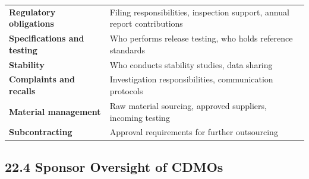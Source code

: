 \documentclass[
  11pt,
  a4paper,
]{report}
\begin{document}
\begin{longtable}[]{@{}ll@{}}
\begin{minipage}[t]{0.38\columnwidth}
\textbf{Regulatory obligations}\strut
\end{minipage} & \begin{minipage}[t]{0.56\columnwidth}\raggedright
Filing responsibilities, inspection support, annual report
contributions\strut
\end{minipage}\tabularnewline
\begin{minipage}[t]{0.38\columnwidth}\raggedright
\textbf{Specifications and testing}\strut
\end{minipage} & \begin{minipage}[t]{0.56\columnwidth}\raggedright
Who performs release testing, who holds reference standards\strut
\end{minipage}\tabularnewline
\begin{minipage}[t]{0.38\columnwidth}\raggedright
\textbf{Stability}\strut
\end{minipage} & \begin{minipage}[t]{0.56\columnwidth}\raggedright
Who conducts stability studies, data sharing\strut
\end{minipage}\tabularnewline
\begin{minipage}[t]{0.38\columnwidth}\raggedright
\textbf{Complaints and recalls}\strut
\end{minipage} & \begin{minipage}[t]{0.56\columnwidth}\raggedright
Investigation responsibilities, communication protocols\strut
\end{minipage}\tabularnewline
\begin{minipage}[t]{0.38\columnwidth}\raggedright
\textbf{Material management}\strut
\end{minipage} & \begin{minipage}[t]{0.56\columnwidth}\raggedright
Raw material sourcing, approved suppliers, incoming testing\strut
\end{minipage}\tabularnewline
\begin{minipage}[t]{0.38\columnwidth}\raggedright
\textbf{Subcontracting}\strut
\end{minipage} & \begin{minipage}[t]{0.56\columnwidth}\raggedright
Approval requirements for further outsourcing\strut
\end{minipage}\tabularnewline
\bottomrule
\end{longtable}

\hypertarget{sponsor-oversight-of-cdmos}{%
\subsection{22.4 Sponsor Oversight of
CDMOs}\label{sponsor-oversight-of-cdmos}}
\end{document}
